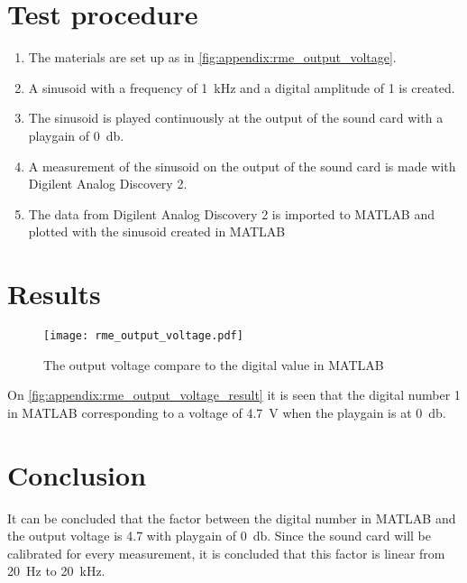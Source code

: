\section*{Test procedure}


\begin{enumerate}
\item The materials are set up as in \autoref{fig:appendix:rme_output_voltage}.
\item A sinusoid with a frequency of \SI{1}{\kilo\hertz} and a digital amplitude of 1 is created.  
\item The sinusoid is played continuously at the output of the sound card with a playgain of  \SI{0}{\decibel}.
\item  A measurement of the sinusoid on the output of the sound card is made with Digilent Analog Discovery 2.
\item The data from Digilent Analog Discovery 2 is imported to MATLAB and plotted with the sinusoid created in MATLAB
\end{enumerate}

\section*{Results}

\begin{figure}[htbp!]
	\centering
		\texttt{[image: rme\_output\_voltage.pdf]}
		\caption{The output voltage compare to the digital value in MATLAB}
		\label{fig:appendix:rme_output_voltage_result}
\end{figure}

On  \autoref{fig:appendix:rme_output_voltage_result} it is seen that the digital number 1 in MATLAB corresponding to a voltage of \SI{4.7}{\volt} when the playgain is at \SI{0}{\decibel}. 

\section*{Conclusion}
It can be concluded that the factor between the digital number in MATLAB and the output voltage is 4.7 with playgain of \SI{0}{\decibel}. Since the sound card will be calibrated for every measurement, it is concluded that this factor is linear from \SI{20}{\hertz} to \SI{20}{\kilo\hertz}. 



